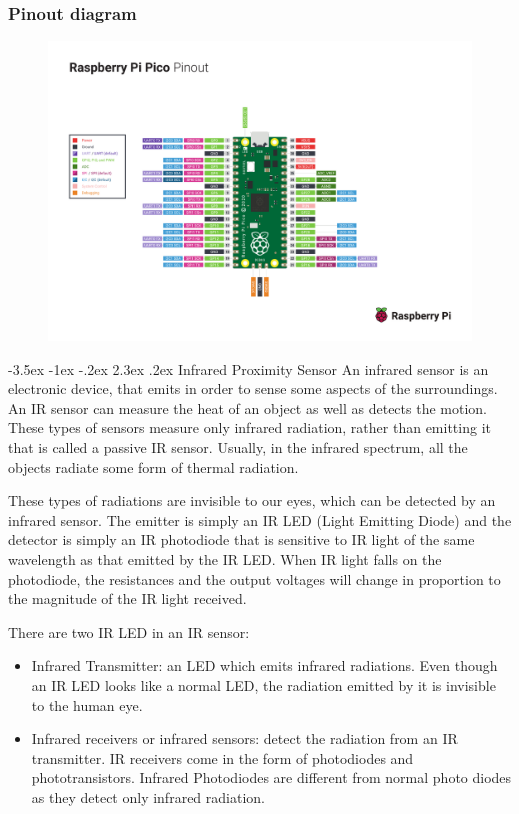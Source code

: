 \documentclass[13pt,a4paper,twoside]{report}
\makeatletter
\renewcommand\section{\@startsection {section}{1}{-1em}%
  {-3.5ex \@plus -1ex \@minus -.2ex}%
  {2.3ex \@plus.2ex}%
  {\normalfont\Large\bfseries}}
\makeatother
\begin{document}
\subsubsection{Pinout diagram}
\begin{figure}[H]
\centering
\includegraphics[scale=0.6, trim={0cm, 3cm, 0cm, 5cm},clip]{images/Pico-R3-A4-Pinout.pdf}
\end{figure}

\section{Infrared Proximity Sensor}
An infrared sensor is an electronic device, that emits in order to sense some aspects of the surroundings. An IR sensor can measure the heat of an object as well as detects the motion. These types of sensors measure only infrared radiation, rather than emitting it that is called a passive IR sensor. Usually, in the infrared spectrum, all the objects radiate some form of thermal radiation.

These types of radiations are invisible to our eyes, which can be detected by an infrared sensor. The emitter is simply an IR LED (Light Emitting Diode) and the detector is simply an IR photodiode that is sensitive to IR light of the same wavelength as that emitted by the IR LED. When IR light falls on the photodiode, the resistances and the output voltages will change in proportion to the magnitude of the IR light received.

There are two IR LED in an IR sensor:
\begin{itemize}
\item Infrared Transmitter: an LED which emits infrared radiations. Even though an IR LED looks like a normal LED, the radiation emitted by it is invisible to the human eye.
\item Infrared receivers or infrared sensors: detect the radiation from an IR transmitter. IR receivers come in the form of photodiodes and phototransistors. Infrared Photodiodes are different from normal photo diodes as they detect only infrared radiation.
\end{itemize}
\end{document}
